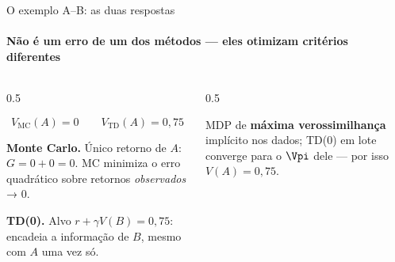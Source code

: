 \documentclass[aspectratio=169, 11pt]{beamer}
\begin{document}
\begin{frame}{O exemplo A--B: as duas respostas}
  \framesubtitle{Não é um erro de um dos métodos — eles otimizam critérios diferentes}

  \begin{columns}[T]
    \begin{column}{0.5\textwidth}
      \begin{respbox}
        \[ V_{\mathrm{MC}}(A) = 0 \qquad V_{\mathrm{TD}}(A) = 0{,}75 \]
      \end{respbox}

      \smallskip
      \textbf{Monte Carlo.} Único retorno de $A$: $G = 0 + 0 = 0$. MC
      minimiza o erro quadrático sobre retornos \emph{observados} → $0$.

      \smallskip
      \textbf{TD(0).} Alvo $r + \gamma V(B) = 0{,}75$: encadeia a
      informação de $B$, mesmo com $A$ uma vez só.
    \end{column}
    \begin{column}{0.5\textwidth}
      \begin{center}
      \end{center}

      \vspace{-0.7em}
      \begin{ideiabox}
        MDP de \textbf{máxima verossimilhança} implícito nos dados; TD(0) em
        lote converge para o $\Vpi$ dele — por isso $V(A) = 0{,}75$.
      \end{ideiabox}
    \end{column}
  \end{columns}
\end{frame}
\end{document}
